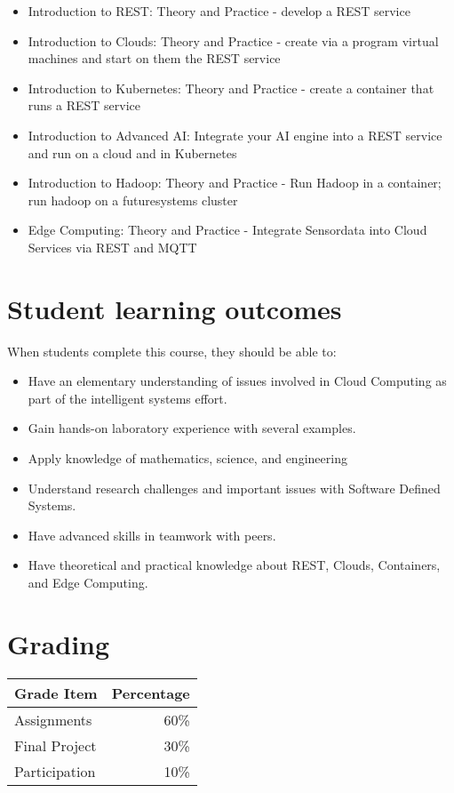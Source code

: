\begin{itemize}
\item Introduction to REST: Theory and Practice - develop a REST service
\item Introduction to Clouds: Theory and Practice - create via a
  program virtual machines and start on them the REST service
\item Introduction to Kubernetes: Theory and Practice - create a
  container that runs a REST service
\item Introduction to Advanced AI: Integrate your AI engine into a
  REST service and run on a cloud and in Kubernetes 
\item Introduction to Hadoop: Theory and Practice - Run Hadoop in a
  container; run hadoop on a futuresystems cluster
\item Edge Computing: Theory and Practice - Integrate Sensordata into
  Cloud Services via REST and MQTT
\end{itemize}


\section{Student learning outcomes}

When students complete this course, they should be able to:

\begin{itemize}
\item Have an elementary understanding of issues involved in Cloud
  Computing as part of the intelligent systems effort.
\item Gain hands-on laboratory experience with several examples.
\item Apply knowledge of mathematics, science, and engineering
\item Understand research challenges and important issues with
  Software Defined Systems.
\item	Have advanced skills in teamwork with peers.
\item Have theoretical and practical knowledge about REST, Clouds,
  Containers, and Edge Computing.
\end{itemize}


\section{Grading}

\begin{tabular}{lr}
  Grade Item	  & Percentage\\
  \hline
  Assignments	  & 60\%\\
  Final Project	& 30\%\\
  Participation	& 10\%\\
  \hline
\end{tabular}


